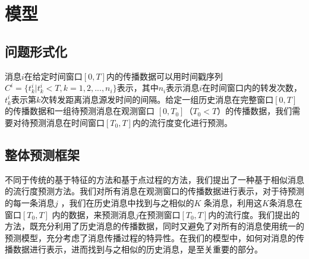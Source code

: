 %

\section{模型}
\subsection{问题形式化}
消息$i$在给定时间窗口$[0,T]$内的传播数据可以用时间戳序列$C^i=\{t_k^i|t_k^i<T,k=1,2,...,n_i\}$表示，其中$n_i$表示消息$i$在时间窗口内的转发次数，$t_k^i$表示第$k$次转发距离消息源发时间的间隔。给定一组历史消息在完整窗口$[0,T]$的传播数据和一组待预测消息在观测窗口 $[0,T_0]$（$T_0<T$）的传播数据，我们需要对待预测消息在时间窗口$[T_0,T]$内的流行度变化进行预测。

\subsection{整体预测框架}
不同于传统的基于特征的方法和基于点过程的方法，我们提出了一种基于相似消息的流行度预测方法。我们对所有消息在观测窗口的传播数据进行表示，对于待预测的每一条消息$j$ ，我们在历史消息中找到与之相似的$K$ 条消息，利用这$K$条消息在窗口$[T_0,T]$ 内的数据，来预测消息$j$在预测窗口$[T_0,T]$内的流行度。我们提出的方法，既充分利用了历史消息的传播数据，同时又避免了对所有的消息使用统一的预测模型，充分考虑了消息传播过程的特异性。在我们的模型中，如何对消息的传播数据进行表示，进而找到与之相似的历史消息，是至关重要的部分。

